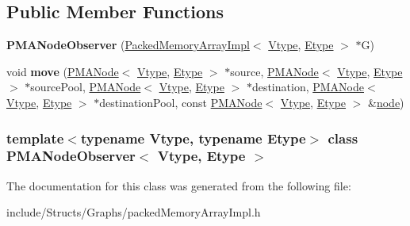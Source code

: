 \subsection*{Public Member Functions}
\begin{DoxyCompactItemize}
\item 
\hypertarget{class_p_m_a_node_observer_a94e4310af5fe2299b4f8f930f4fd6c63}{
{\bfseries PMANodeObserver} (\hyperlink{class_packed_memory_array_impl}{PackedMemoryArrayImpl}$<$ \hyperlink{class_vtype}{Vtype}, \hyperlink{class_etype}{Etype} $>$ $\ast$G)}
\label{class_p_m_a_node_observer_a94e4310af5fe2299b4f8f930f4fd6c63}

\item 
\hypertarget{class_p_m_a_node_observer_a84164a2646b9ea0fe1181aff42e80cf7}{
void {\bfseries move} (\hyperlink{class_p_m_a_node}{PMANode}$<$ \hyperlink{class_vtype}{Vtype}, \hyperlink{class_etype}{Etype} $>$ $\ast$source, \hyperlink{class_p_m_a_node}{PMANode}$<$ \hyperlink{class_vtype}{Vtype}, \hyperlink{class_etype}{Etype} $>$ $\ast$sourcePool, \hyperlink{class_p_m_a_node}{PMANode}$<$ \hyperlink{class_vtype}{Vtype}, \hyperlink{class_etype}{Etype} $>$ $\ast$destination, \hyperlink{class_p_m_a_node}{PMANode}$<$ \hyperlink{class_vtype}{Vtype}, \hyperlink{class_etype}{Etype} $>$ $\ast$destinationPool, const \hyperlink{class_p_m_a_node}{PMANode}$<$ \hyperlink{class_vtype}{Vtype}, \hyperlink{class_etype}{Etype} $>$ \&\hyperlink{classnode}{node})}
\label{class_p_m_a_node_observer_a84164a2646b9ea0fe1181aff42e80cf7}

\end{DoxyCompactItemize}
\subsubsection*{template$<$typename Vtype, typename Etype$>$ class PMANodeObserver$<$ Vtype, Etype $>$}



The documentation for this class was generated from the following file:\begin{DoxyCompactItemize}
\item 
include/Structs/Graphs/packedMemoryArrayImpl.h\end{DoxyCompactItemize}

